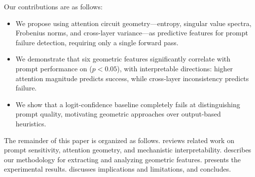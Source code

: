 Our contributions are as follows:
\begin{itemize}[leftmargin=*,itemsep=0pt,topsep=0pt]
    \item We propose using attention circuit geometry---entropy, singular value spectra, Frobenius norms, and cross-layer variance---as predictive features for prompt failure detection, requiring only a single forward pass.
    \item We demonstrate that six geometric features significantly correlate with prompt performance on \ssttwo ($p < 0.05$), with interpretable directions: higher attention magnitude predicts success, while cross-layer inconsistency predicts failure.
    \item We show that a logit-confidence baseline completely fails at distinguishing prompt quality, motivating geometric approaches over output-based heuristics.
\end{itemize}

The remainder of this paper is organized as follows.
 reviews related work on prompt sensitivity, attention geometry, and mechanistic interpretability.
 describes our methodology for extracting and analyzing geometric features.
 presents the experimental results.
 discusses implications and limitations, and  concludes.
